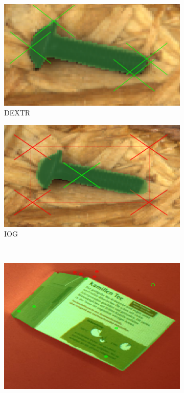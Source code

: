 \begin{figure}
	\hfill
	\begin{subfigure}[t]{0.3\textwidth}
		\centering
		\includegraphics[width=\textwidth]{figures/appendix/method_predictions/screw57_dextr.png}
		\caption{
			DEXTR
		}
	\end{subfigure}
	\hfill
	\begin{subfigure}[t]{0.3\textwidth}
		\centering
		\includegraphics[width=\textwidth]{figures/appendix/method_predictions/screw57_iog.png}
		\caption{
			IOG
		}
	\end{subfigure}
	\\
	\begin{subfigure}[t]{0.3\textwidth}
		\centering
		\includegraphics[width=\textwidth]{figures/appendix/method_predictions/tea17_watershed.png}

\end{subfigure}
\end{figure}
